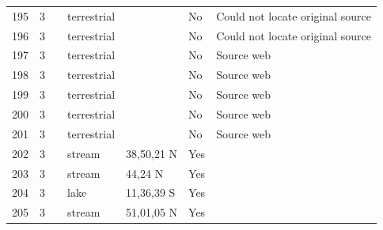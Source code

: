 \documentclass[12pt]{article}
\begin{document}
\begin{landscape}
\begin{table}[h!]
{\begin{tabular}{p{2.8cm}p{1.3cm}p{5.5cm}p{2.2cm}p{2.5cm}lp{3.5cm}}
        195   & 3 & \citet{Schoenly1983a}    & terrestrial &       & No    & Could not locate original source \\
        196   & 3 & \citet{Schoenly1983a}    & terrestrial &       & No    & Could not locate original source \\
        197   & 3 & \citet{Mohr1943}    & terrestrial &       & No    & Source web \\
        198   & 3 & \citet{Schoenly1983}  & terrestrial &       & No    & Source web \\
        199   & 3 & \citet{Valiela1969}    & terrestrial &       & No    & Source web \\
        200   & 3 & \citet{Valiela1974}    & terrestrial &       & No    & Source web \\
        201   & 3 & \citet{Valiela1974}    & terrestrial &       & No    & Source web \\
        202   & 3 & \citet{Allan1982}    & stream & 38,50,21 N & Yes   &       \\
        203   & 3 & \citet{Collins1976}    & stream & 44,24 N & Yes   &       \\
        204   & 3 & \citet{Fryer1959} & lake  & 11,36,39 S & Yes   &       \\
        205   & 3 & \citet{Hildrew1985}     & stream & 51,01,05 N & Yes   &       \\
        \hline
      \end{tabular}}%
      \end{table}

        \newpage


\end{landscape}
\end{document}
